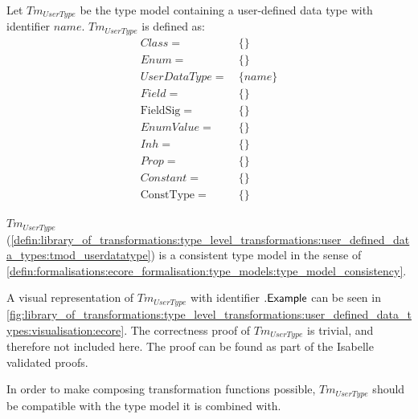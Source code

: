 \begin{defin}
\label{defin:library_of_transformations:type_level_transformations:user_defined_data_types:tmod_userdatatype}
Let $Tm_{UserType}$ be the type model containing a user-defined data type with identifier $name$. $Tm_{UserType}$ is defined as:
\begin{align*}
Class =\ &\{\} \\
Enum =\ &\{\} \\
UserDataType =\ &\{name\} \\
Field =\ &\{\} \\
\mathrm{FieldSig} =\ &\{\} \\
EnumValue =\ &\{\} \\
Inh =\ &\{\} \\
Prop =\ &\{\} \\
Constant =\ &\{\} \\
\mathrm{ConstType} =\ &\{\}
\end{align*}
\end{defin}

\begin{thm}
\label{defin:library_of_transformations:type_level_transformations:user_defined_data_types:tmod_userdatatype_correct}
$Tm_{UserType}$ (\cref{defin:library_of_transformations:type_level_transformations:user_defined_data_types:tmod_userdatatype}) is a consistent type model in the sense of \cref{defin:formalisations:ecore_formalisation:type_models:type_model_consistency}.
\end{thm}

A visual representation of $Tm_{UserType}$ with identifier $.\mathsf{Example}$ can be seen in \cref{fig:library_of_transformations:type_level_transformations:user_defined_data_types:visualisation:ecore}. The correctness proof of $Tm_{UserType}$ is trivial, and therefore not included here. The proof can be found as part of the Isabelle validated proofs.

In order to make composing transformation functions possible, $Tm_{UserType}$ should be compatible with the type model it is combined with.

